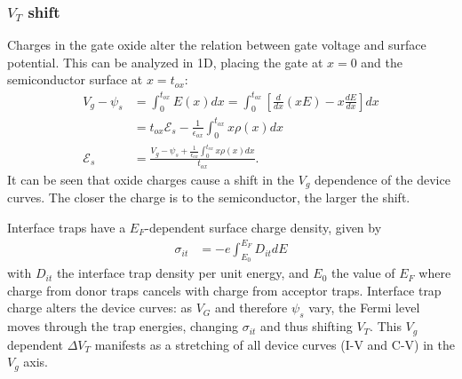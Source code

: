 \subsubsection{$V_T$ shift}
\label{corrimientovt}
Charges in the gate oxide alter the relation between gate voltage and
surface potential.
This can be analyzed in 1D,
placing the gate at $x=0$ and the semiconductor surface at $x=t_{ox}$:
\begin{align}
    V_g-\psi_s&=\int_0^{t_{ox}}E(x)dx=
    \int_0^{t_{ox}}\left[\frac d{dx}(xE)-x\frac{dE}{dx}\right]dx\\
    &=t_{ox}\mathscr{E}_s-\frac 1{\epsilon_{ox}}\int_0^{t_{ox}}x\rho(x)dx\\
    \mathscr{E}_s &= \frac{V_g-\psi_s+
        \frac 1{\epsilon_{ox}}\int_0^{t_{ox}}x\rho(x)dx}{t_{ox}}.
        \label{eq:corrimiento_vt_mos}
\end{align}
It can be seen that oxide charges cause a shift in the $V_g$
dependence of the device curves.
The closer the charge is to the semiconductor,
the larger the shift.

Interface traps have a $E_F$-dependent surface charge density,
given by
\begin{align*}
    \sigma_{it} &= -e\int_{E_0}^{E_F} D_{it}dE
\end{align*}
with $D_{it}$ the interface trap density per unit energy,
and $E_0$ the value of $E_F$ where charge from donor traps cancels
with charge from acceptor traps.
Interface trap charge alters the device curves:
as $V_G$ and therefore $\psi_s$ vary,
the Fermi level moves through the trap energies,
changing $\sigma_{it}$ and thus shifting $V_T$.
This $V_g$ dependent $\Delta V_T$
manifests as a stretching of all device curves (I-V and C-V)
in the $V_g$ axis.
